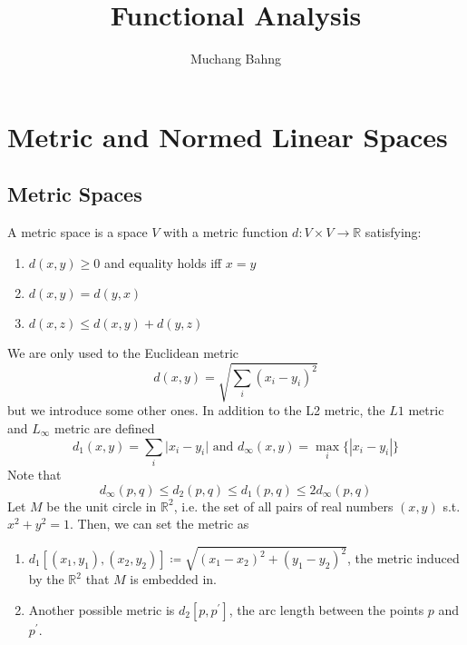 \documentclass{article}
\theoremstyle{remark}
\theoremstyle{definition}
\begin{document}
\pagestyle{fancy}

\cfoot{\thepage / \pageref{LastPage}}

\title{Functional Analysis}
\author{Muchang Bahng}

\maketitle

\section{Metric and Normed Linear Spaces}

\subsection{Metric Spaces}
A metric space is a space $V$ with a metric function $d: V \times V \longrightarrow \mathbb{R}$ satisfying: 
\begin{enumerate}
    \item $d(x, y) \geq 0$ and equality holds iff $x = y$ 
    \item $d(x, y) = d(y, x)$ 
    \item $d(x, z) \leq d(x, y) + d(y, z)$ 
\end{enumerate}
We are only used to the Euclidean metric 
\[d(x, y) = \sqrt{\sum_i (x_i - y_i)^2}\]
but we introduce some other ones. In addition to the L2 metric, the $L1$ metric and $L_\infty$ metric are defined
\[d_1(x, y) = \sum_i \big| x_i - y_i \big| \text{ and } d_\infty (x, y) = \max_{i} \big\{ | x_i - y_i | \big\}\]
Note that 
\[d_\infty(p, q) \leq d_2 (p, q) \leq d_1 (p, q) \leq 2 d_\infty(p, q)\]
Let $M$ be the unit circle in $\mathbb{R}^2$, i.e. the set of all pairs of real numbers $(x, y)$ s.t. $x^2 + y^2 = 1$. Then, we can set the metric as 
\begin{enumerate}
    \item $d_1 [ (x_1, y_1), (x_2, y_2)] \coloneqq \sqrt{(x_1 - x_2)^2 + (y_1 - y_2)^2}$, the metric induced by the $\mathbb{R}^2$ that $M$ is embedded in. 
    \item Another possible metric is $d_2 [p, p^\prime]$, the arc length between the points $p$ and $p^\prime$. 
\end{enumerate}
\end{document}
